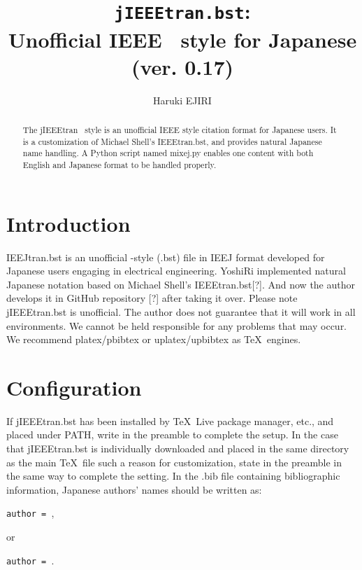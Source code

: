 \documentclass[11pt, a4paper, dvipdfmx]{article}
\title{\texttt{jIEEEtran.bst}:\\Unofficial IEEE \BibTeX\ style for Japanese\\(ver. 0.17)}
\author{Haruki EJIRI}
\begin{document}
\maketitle

\begin{abstract}
The jIEEEtran \BibTeX\ style is an unofficial IEEE style citation format for Japanese users.
It is a customization of Michael Shell's IEEEtran.bst, and provides natural Japanese name handling.
A Python script named mixej.py enables one content with both English and Japanese format to be handled properly.
\end{abstract}


\section{Introduction}

IEEJtran.bst is an unofficial \BibTeX-style (.bst) file in IEEJ format developed for Japanese users engaging in electrical engineering.
YoshiRi implemented natural Japanese notation based on Michael Shell's IEEEtran.bst[?].
And now the author develops it in GitHub repository [?] after taking it over.
Please note jIEEEtran.bst is unofficial.
The author does not guarantee that it will work in all environments.
We cannot be held responsible for any problems that may occur.
We recommend platex/pbibtex or uplatex/upbibtex as \TeX\ engines.


\section{Configuration}

If jIEEEtran.bst has been installed by \TeX\ Live package manager, etc., and placed under PATH, write \texttt{\string{}} in the preamble to complete the setup.
In the case that jIEEEtran.bst is individually downloaded and placed in the same directory as the main \TeX\ file such a reason for customization, state \texttt{\string{}} in the preamble in the same way to complete the setting.
In the .bib file containing bibliographic information, Japanese authors' names should be written as:
\begin{center}
\texttt{author = },
\end{center}
or
\begin{center}
\texttt{author = }.
\end{center}
\end{document}
